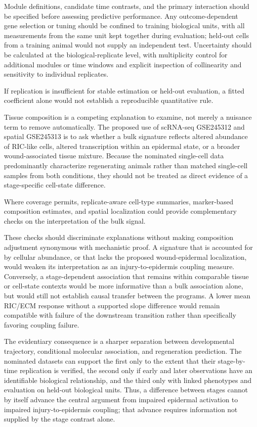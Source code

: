 \documentclass[11pt]{article}
\begin{document}
Module definitions, candidate time contrasts, and the primary interaction should be specified before assessing predictive performance. Any outcome-dependent gene selection or tuning should be confined to training biological units, with all measurements from the same unit kept together during evaluation; held-out cells from a training animal would not supply an independent test. Uncertainty should be calculated at the biological-replicate level, with multiplicity control for additional modules or time windows and explicit inspection of collinearity and sensitivity to individual replicates.

If replication is insufficient for stable estimation or held-out evaluation, a fitted coefficient alone would not establish a reproducible quantitative rule.

Tissue composition is a competing explanation to examine, not merely a nuisance term to remove automatically. The proposed use of scRNA-seq GSE245312 and spatial GSE245313 is to ask whether a bulk signature reflects altered abundance of RIC-like cells, altered transcription within an epidermal state, or a broader wound-associated tissue mixture. Because the nominated single-cell data predominantly characterize regenerating animals rather than matched single-cell samples from both conditions, they should not be treated as direct evidence of a stage-specific cell-state difference.

Where coverage permits, replicate-aware cell-type summaries, marker-based composition estimates, and spatial localization could provide complementary checks on the interpretation of the bulk signal.

These checks should discriminate explanations without making composition adjustment synonymous with mechanistic proof. A signature that is accounted for by cellular abundance, or that lacks the proposed wound-epidermal localization, would weaken its interpretation as an injury-to-epidermis coupling measure. Conversely, a stage-dependent association that remains within comparable tissue or cell-state contexts would be more informative than a bulk association alone, but would still not establish causal transfer between the programs. A lower mean RIC/ECM response without a supported slope difference would remain compatible with failure of the downstream transition rather than specifically favoring coupling failure.

The evidentiary consequence is a sharper separation between developmental trajectory, conditional molecular association, and regeneration prediction. The nominated datasets can support the first only to the extent that their stage-by-time replication is verified, the second only if early and later observations have an identifiable biological relationship, and the third only with linked phenotypes and evaluation on held-out biological units. Thus, a difference between stages cannot by itself advance the central argument from impaired epidermal activation to impaired injury-to-epidermis coupling; that advance requires information not supplied by the stage contrast alone.
\end{document}
